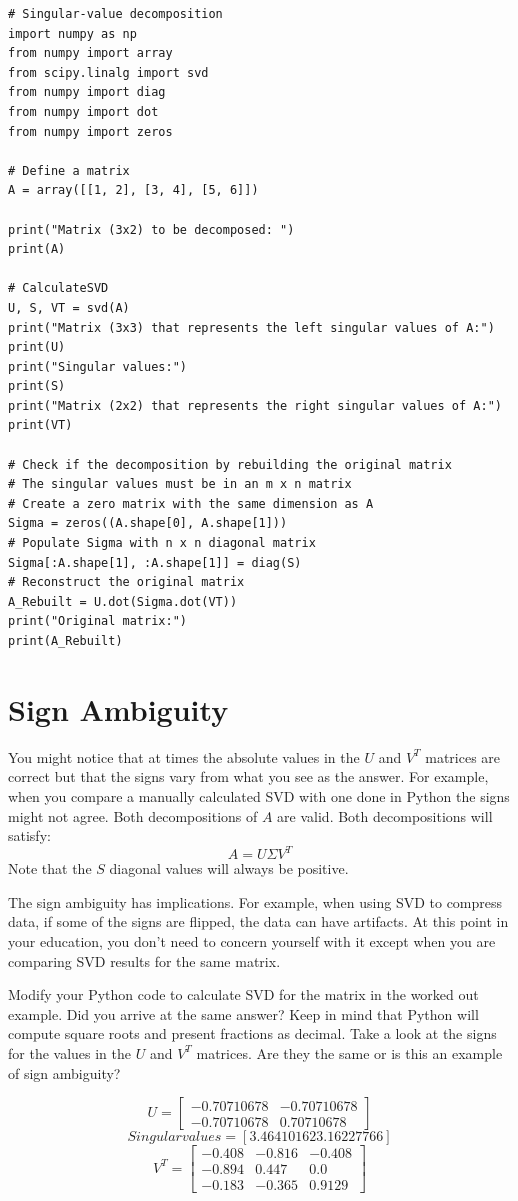 \begin{Verbatim}
# Singular-value decomposition
import numpy as np
from numpy import array
from scipy.linalg import svd
from numpy import diag
from numpy import dot
from numpy import zeros

# Define a matrix
A = array([[1, 2], [3, 4], [5, 6]])

print("Matrix (3x2) to be decomposed: ")
print(A)

# CalculateSVD
U, S, VT = svd(A)
print("Matrix (3x3) that represents the left singular values of A:")
print(U)
print("Singular values:")
print(S)
print("Matrix (2x2) that represents the right singular values of A:")
print(VT)

# Check if the decomposition by rebuilding the original matrix
# The singular values must be in an m x n matrix 
# Create a zero matrix with the same dimension as A
Sigma = zeros((A.shape[0], A.shape[1]))
# Populate Sigma with n x n diagonal matrix
Sigma[:A.shape[1], :A.shape[1]] = diag(S)
# Reconstruct the original matrix
A_Rebuilt = U.dot(Sigma.dot(VT))
print("Original matrix:")
print(A_Rebuilt)
\end{Verbatim}

\section{Sign Ambiguity}
You might notice that at times the absolute values in the $U$ and $V^T$ matrices are correct but that the signs vary from what you see as the answer. For example, when you compare a manually calculated SVD with one done in Python the signs might not agree. Both decompositions of $A$ are valid. Both decompositions will satisfy:
$$A = U \Sigma V^T$$
Note that the $S$ diagonal values will always be positive. 

The sign ambiguity has implications. For example, when using SVD to compress data, if some of the signs are flipped, the data can have artifacts. At this point in your education, you don't need to concern yourself with it except when you are comparing SVD results for the same matrix.

\begin{Exercise}[title={Single Value Decomposition}, label=svd]
Modify your Python code to calculate SVD for the matrix in the worked out example. Did you arrive at the same answer? Keep in mind that Python will compute square roots and present fractions as decimal. Take a look at the signs for the values in the $U$ and $V^T$ matrices. Are they the same or is this an example of sign ambiguity? 
\end{Exercise}
\begin{Answer}[ref=svd]
$$U = 
\begin{bmatrix}
-0.70710678 & -0.70710678  \\
 -0.70710678 & 0.70710678 
\end{bmatrix}
$$
$$Singular values = [3.46410162 3.16227766]
$$
$$V^T =
\begin{bmatrix}
 -0.408 & -0.816 & -0.408  \\
 -0.894 & 0.447 & 0.0  \\
 -0.183 & -0.365  & 0.9129 
\end{bmatrix}
$$
\end{Answer}

